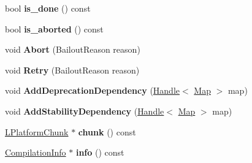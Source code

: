 \begin{DoxyCompactItemize}
\item 
bool {\bfseries is\+\_\+done} () const \hypertarget{classv8_1_1internal_1_1_b_a_s_e___e_m_b_e_d_d_e_d_a0031cef7331d2350e58dbdc3263732ce}{}\label{classv8_1_1internal_1_1_b_a_s_e___e_m_b_e_d_d_e_d_a0031cef7331d2350e58dbdc3263732ce}

\item 
bool {\bfseries is\+\_\+aborted} () const \hypertarget{classv8_1_1internal_1_1_b_a_s_e___e_m_b_e_d_d_e_d_a66a4d974d6e16b53a933a42ad4988a3e}{}\label{classv8_1_1internal_1_1_b_a_s_e___e_m_b_e_d_d_e_d_a66a4d974d6e16b53a933a42ad4988a3e}

\item 
void {\bfseries Abort} (Bailout\+Reason reason)\hypertarget{classv8_1_1internal_1_1_b_a_s_e___e_m_b_e_d_d_e_d_ae06ab65769fc7aa8bbfb029a8457af66}{}\label{classv8_1_1internal_1_1_b_a_s_e___e_m_b_e_d_d_e_d_ae06ab65769fc7aa8bbfb029a8457af66}

\item 
void {\bfseries Retry} (Bailout\+Reason reason)\hypertarget{classv8_1_1internal_1_1_b_a_s_e___e_m_b_e_d_d_e_d_a020bd9e352dd28cd3e29ca3f9c04a1d9}{}\label{classv8_1_1internal_1_1_b_a_s_e___e_m_b_e_d_d_e_d_a020bd9e352dd28cd3e29ca3f9c04a1d9}

\item 
void {\bfseries Add\+Deprecation\+Dependency} (\hyperlink{classv8_1_1internal_1_1_handle}{Handle}$<$ \hyperlink{classv8_1_1internal_1_1_map}{Map} $>$ map)\hypertarget{classv8_1_1internal_1_1_b_a_s_e___e_m_b_e_d_d_e_d_a0e88507f55e482cdb33d9e81793a5bb9}{}\label{classv8_1_1internal_1_1_b_a_s_e___e_m_b_e_d_d_e_d_a0e88507f55e482cdb33d9e81793a5bb9}

\item 
void {\bfseries Add\+Stability\+Dependency} (\hyperlink{classv8_1_1internal_1_1_handle}{Handle}$<$ \hyperlink{classv8_1_1internal_1_1_map}{Map} $>$ map)\hypertarget{classv8_1_1internal_1_1_b_a_s_e___e_m_b_e_d_d_e_d_a8ef3abce44d46c9f00c535c0bb3fe0a6}{}\label{classv8_1_1internal_1_1_b_a_s_e___e_m_b_e_d_d_e_d_a8ef3abce44d46c9f00c535c0bb3fe0a6}

\item 
\hyperlink{classv8_1_1internal_1_1_l_platform_chunk}{L\+Platform\+Chunk} $\ast$ {\bfseries chunk} () const \hypertarget{classv8_1_1internal_1_1_b_a_s_e___e_m_b_e_d_d_e_d_a5ad71a5061accec334446e13a5f58727}{}\label{classv8_1_1internal_1_1_b_a_s_e___e_m_b_e_d_d_e_d_a5ad71a5061accec334446e13a5f58727}

\item 
\hyperlink{classv8_1_1internal_1_1_compilation_info}{Compilation\+Info} $\ast$ {\bfseries info} () const \hypertarget{classv8_1_1internal_1_1_b_a_s_e___e_m_b_e_d_d_e_d_aea2c1678ce70231a92e37e067c06615d}{}\label{classv8_1_1internal_1_1_b_a_s_e___e_m_b_e_d_d_e_d_aea2c1678ce70231a92e37e067c06615d}


\end{DoxyCompactItemize}
